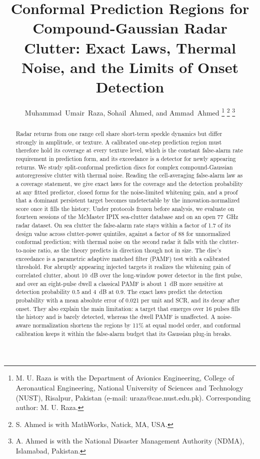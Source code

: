 \documentclass[journal]{IEEEtran}
\begin{document}
\title{Conformal Prediction Regions for Compound-Gaussian Radar Clutter: Exact Laws, Thermal Noise, and the Limits of Onset Detection}

\author{Muhammad~Umair~Raza, Sohail~Ahmed, and Ammad~Ahmed%
\thanks{M. U. Raza is with the Department of Avionics Engineering, College of Aeronautical Engineering, National University of Sciences and Technology (NUST), Risalpur, Pakistan (e-mail: uraza@cae.nust.edu.pk). Corresponding author: M. U. Raza.}%
\thanks{S. Ahmed is with MathWorks, Natick, MA, USA.}%
\thanks{A. Ahmed is with the National Disaster Management Authority (NDMA), Islamabad, Pakistan.}}

\maketitle

\begin{abstract}
Radar returns from one range cell share short-term speckle dynamics but differ strongly in amplitude, or texture. A calibrated one-step prediction region must therefore hold its coverage at every texture level, which is the constant false-alarm rate requirement in prediction form, and its exceedance is a detector for newly appearing returns. We study split-conformal prediction discs for complex compound-Gaussian autoregressive clutter with thermal noise. Reading the cell-averaging false-alarm law as a coverage statement, we give exact laws for the coverage and the detection probability at any fitted predictor, closed forms for the noise-limited whitening gain, and a proof that a dominant persistent target becomes undetectable by the innovation-normalized score once it fills the history. Under protocols frozen before analysis, we evaluate on fourteen sessions of the McMaster IPIX sea-clutter database and on an open 77~GHz radar dataset. On sea clutter the false-alarm rate stays within a factor of 1.7 of its design value across clutter-power quintiles, against a factor of 88 for unnormalized conformal prediction; with thermal noise on the second radar it falls with the clutter-to-noise ratio, as the theory predicts in direction though not in size. The disc's exceedance is a parametric adaptive matched filter (PAMF) test with a calibrated threshold. For abruptly appearing injected targets it realizes the whitening gain of correlated clutter, about 10~dB over the long-window power detector in the first pulse, and over an eight-pulse dwell a classical PAMF is about 1~dB more sensitive at detection probability 0.5 and 4~dB at 0.9. The exact laws predict the detection probability with a mean absolute error of 0.021 per unit and SCR, and its decay after onset. They also explain the main limitation: a target that emerges over 16 pulses fills the history and is barely detected, whereas the dwell PAMF is unaffected. A noise-aware normalization shortens the regions by 11\% at equal model order, and conformal calibration keeps it within the false-alarm budget that its Gaussian plug-in breaks.
\end{abstract}
\end{document}
